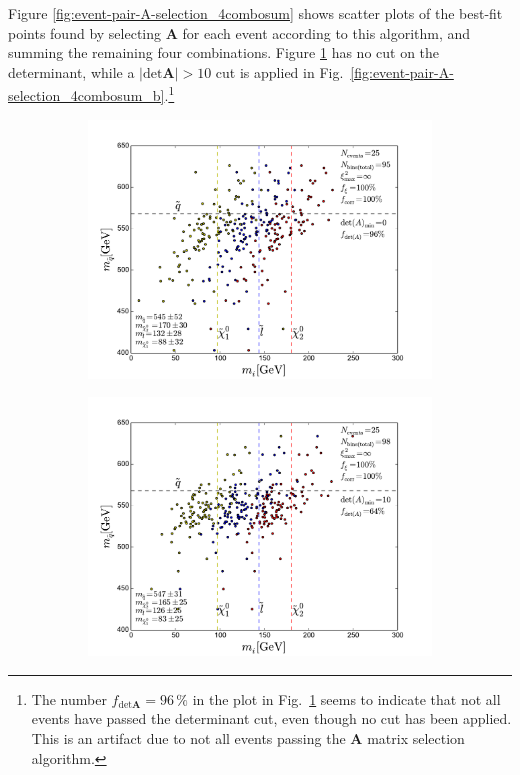 \documentclass[twoside,english]{uiofysmaster}
\begin{document}
Figure \ref{fig:event-pair-A-selection_4combosum} shows scatter plots of the best-fit points found by selecting $\mathbf{A}$ for each event according to this algorithm, and summing the remaining four combinations. Figure \ref{fig:event-pair-A-selection_4combosum_a} has no cut on the determinant, while a $|\mathrm{det}\mathbf A|>10$ cut is applied in Fig.\ \ref{fig:event-pair-A-selection_4combosum_b}.\footnote{The number $f_{\mathrm{det}\mathbf A} = 96\,\%$ in the plot in Fig.\ \ref{fig:event-pair-A-selection_4combosum_a} seems to indicate that not all events have passed the determinant cut, even though no cut has been applied. This is an artifact due to not all events passing the $\mathbf{A}$ matrix selection algorithm.}
\begin{figure}[hbtp!]
	\centering
	\begin{subfigure}[b]{0.45\textwidth}
		\includegraphics[width=\textwidth]{figures/improving_combinatorics/herwigpp_nosmear_nodetAcut_A_matrix_algorithm_4combosum_TMP.pdf} 
		\caption{ }
		\label{fig:event-pair-A-selection_4combosum_a}
	\end{subfigure}
	\begin{subfigure}[b]{0.45\textwidth}
		\includegraphics[width=\textwidth]{figures/improving_combinatorics/herwigpp_nosmear_detAcut10_A_matrix_algorithm_4combosum_TMP.pdf}

\end{subfigure}
\end{figure}
\end{document}
